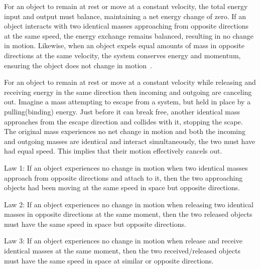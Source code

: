 \documentclass{article}
\begin{document}
    For an object to remain at rest or move at a constant velocity, the total energy input and output must balance, maintaining a net energy change of zero.
    If an object interacts with two identical masses approaching from opposite directions at the same speed, the energy exchange remains balanced, resulting in no change in motion.
    Likewise, when an object expels equal amounts of mass in opposite directions at the same velocity, the system conserves energy and momentum, ensuring the object does not change in motion~\cite{newton1687principia}.

    For an object to remain at rest or move at a constant velocity while releasing and receiving energy in the same direction then incoming and outgoing are canceling out.
    Imagine a mass attempting to escape from a system, but held in place by a pulling(binding) energy.
    Just before it can break free, another identical mass approaches from the escape direction and collides with it, stopping the scape.
    The original mass experiences no net change in motion and both the incoming and outgoing masses are identical and interact simultaneously, the two must have had equal speed.
    This implies that their motion effectively cancels out.


    \begin{tcolorbox}[colback=white, colframe=black, boxrule=1mm, arc=4mm, auto outer arc]
        Law 1: If an object experiences no change in motion when two identical masses approach from opposite directions and attach to it, then the two approaching objects had been moving at the same speed in space but opposite directions.
    \end{tcolorbox}

    \begin{tcolorbox}[colback=white, colframe=black, boxrule=1mm, arc=4mm, auto outer arc]
        Law 2: If an object experiences no change in motion when releasing two identical masses in opposite directions at the same moment, then the two released objects must have the same speed in space but opposite directions.
    \end{tcolorbox}

    \begin{tcolorbox}[colback=white, colframe=black, boxrule=1mm, arc=4mm, auto outer arc]
        Law 3: If an object experiences no change in motion when release and receive  identical masses at the same moment, then the two received/released objects must have the same speed in space  at similar or opposite directions.
    \end{tcolorbox}
\end{document}
